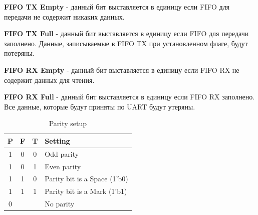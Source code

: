 \documentclass[a4paper,12pt]{article}
\begin{document}
\textbf{FIFO TX Empty} - данный бит выставляется в единицу если FIFO для передачи не содержит никаких данных.

\textbf{FIFO TX Full} - данный бит выставляется в единицу если FIFO для передачи заполнено. Данные, записываемые в FIFO TX при установленном флаге, будут потеряны.

\textbf{FIFO RX Empty} - данный бит выставляется в единицу если FIFO RX не содержит данных для чтения.

\textbf{FIFO RX Full} - данный бит выставляется в единицу если FIFO RX заполнено. Все данные, которые будут приняты по UART будут утеряны.


\begin{table}[H]
  \begin{center}
    \begin{tabular}{ccc|l}
    P&F&T&Setting \\\hline\hline
    1 & 0 & 0 & Odd parity		\\\hline
    1 & 0 & 1 & Even parity	\\\hline
    1 & 1 & 0 & Parity bit is a Space (1'b0)\\\hline
    1 & 1 & 1 & Parity bit is a Mark (1'b1)\\\hline
    0 & & & No parity \\\hline
    \end{tabular}
  \caption{Parity setup}
  \label{tbl:parity}
  \end{center}
\end{table}
\end{document}
